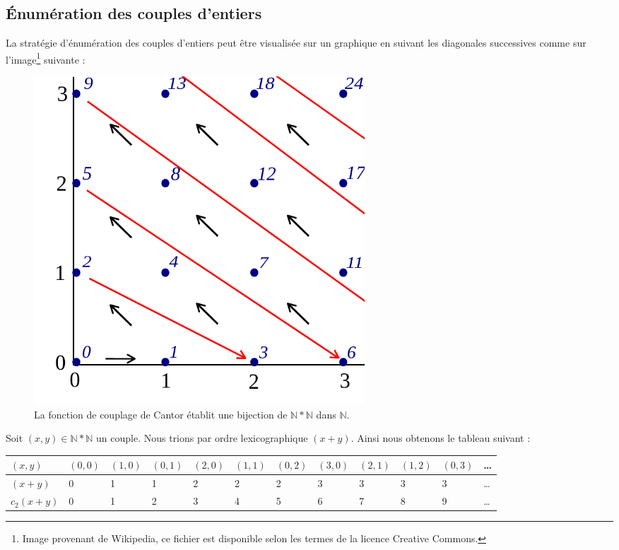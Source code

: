 \subsection{Énumération des couples d'entiers}
La stratégie d'énumération des couples d'entiers peut être visualisée sur un graphique en suivant les diagonales successives comme sur l'image\footnote{Image provenant de Wikipedia, ce fichier est disponible selon les termes de la licence
 Creative Commons.} suivante :
\begin{figure}[!h]
\begin{center}
\includegraphics[width=0.6\textwidth]{files/diagcouples.pdf}
\caption{La fonction de couplage de Cantor établit une bijection de $\mathbb{N}*\mathbb{N}$ dans
 $\mathbb{N}$.}
 \end{center}
\end{figure}

Soit $(x,y) \in \mathbb{N}*\mathbb{N}$ un couple. Nous trions par ordre lexicographique $(x+y)$. Ainsi nous obtenons le tableau suivant :

\begin{tabularx}{1.1\textwidth}{| m{1.5cm} | X | X | X | X | X | X | X | X | X | X | X }
\hline
$(x,y)$ & $(0,0)$ & $(1,0)$ & $(0,1)$ & $(2,0)$ & $(1,1)$ & $(0,2)$ & $(3,0)$ & $(2,1)$ & $(1,2)$ & $(0,3)$ & \ldots \\
\hline
$(x+y)$ & 0 & 1 & 1 & 2 & 2 & 2 & 3 & 3 & 3 & 3 & \ldots \\
\hline
$c_2(x+y)$ & 0 & 1 & 2 & 3 & 4 & 5 & 6 & 7 & 8 & 9 & \ldots \\
\hline
\end{tabularx}

